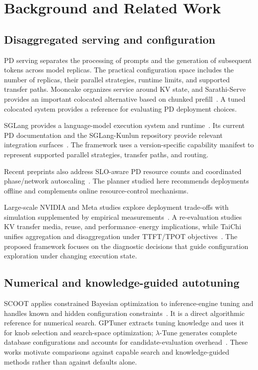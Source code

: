 \documentclass[preprint,12pt]{elsarticle}
\begin{document}
\section{Background and Related Work}
\subsection{Disaggregated serving and configuration}
PD serving separates the processing of prompts and the generation of subsequent tokens across model replicas. The practical configuration space includes the number of replicas, their parallel strategies, runtime limits, and supported transfer paths. Mooncake organizes service around KV state, and Sarathi-Serve provides an important colocated alternative based on chunked prefill~\cite{mooncake2024,sarathi2024}. A tuned colocated system provides a reference for evaluating PD deployment choices.

SGLang provides a language-model execution system and runtime~\cite{sglang2024}. Its current PD documentation and the SGLang-Kunlun repository provide relevant integration surfaces~\cite{sglangpd,kunlunplugin}. The framework uses a version-specific capability manifest to represent supported parallel strategies, transfer paths, and routing.

Recent preprints also address SLO-aware PD resource counts and coordinated phase/network autoscaling~\cite{pdresources2026,tokenscale2025}. The planner studied here recommends deployments offline and complements online resource-control mechanisms.

Large-scale NVIDIA and Meta studies explore deployment trade-offs with simulation supplemented by empirical measurements~\cite{pragmatic2026,metaconfig2026}. A re-evaluation studies KV transfer media, reuse, and performance--energy implications, while TaiChi unifies aggregation and disaggregation under TTFT/TPOT objectives~\cite{revisiting2026,taichi2025}. The proposed framework focuses on the diagnostic decisions that guide configuration exploration under changing execution state.

\subsection{Numerical and knowledge-guided autotuning}
SCOOT applies constrained Bayesian optimization to inference-engine tuning and handles known and hidden configuration constraints~\cite{scoot2025}. It is a direct algorithmic reference for numerical search. GPTuner extracts tuning knowledge and uses it for knob selection and search-space optimization; $\lambda$-Tune generates complete database configurations and accounts for candidate-evaluation overhead~\cite{gptuner2024,lambdatune2025}. These works motivate comparisons against capable search and knowledge-guided methods rather than against defaults alone.
\end{document}
